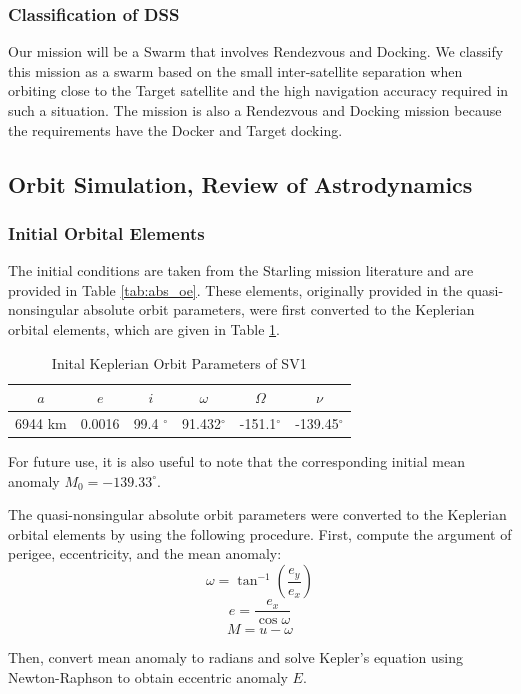 \subsubsection{Classification of DSS} 
Our mission will be a Swarm that involves Rendezvous and Docking. We classify this mission as a swarm based on the small inter-satellite separation when orbiting close to the Target satellite and the high navigation accuracy required in such a situation. The mission is also a Rendezvous and Docking mission because the requirements have the Docker and Target docking.

\subsection{Orbit Simulation, Review of Astrodynamics}
\subsubsection{Initial Orbital Elements} \label{sec:initial_oe}
The initial conditions are taken from the Starling mission literature \cite{krugerorbit} and are provided in Table \ref{tab:abs_oe}. These elements, originally provided in the quasi-nonsingular absolute orbit parameters, were first converted to the Keplerian orbital elements, which are given in Table \ref{tab:abs_oe_kepler}.

\begin{table}[h]
\centering
\begin{tabular}{cccccc} \hline
    $a$ & $e$ & $i$ & $\omega$ & $\Omega$ & $\nu$ \\ \hline 
     6944 km & 0.0016 & 99.4 $^\circ$ & 91.432$^\circ$ & -151.1$^\circ$ & -139.45$^\circ$ \\ \hline
\end{tabular}
\caption{Inital Keplerian Orbit Parameters of SV1}
\label{tab:abs_oe_kepler}
\end{table}

For future use, it is also useful to note that the corresponding initial mean anomaly $M_0= -139.33^\circ$.

The quasi-nonsingular absolute orbit parameters were converted to the Keplerian orbital elements by using the following procedure. First, compute the argument of perigee, eccentricity, and the mean anomaly:
\[
\omega = \tan^{-1} \left( \frac{e_y}{e_x} \right)
\]
\[
e = \frac{e_x}{\cos \omega}
\]
\[
M = u - \omega
\]

Then, convert mean anomaly to radians and solve Kepler's equation using Newton-Raphson to obtain eccentric anomaly \( E \).

